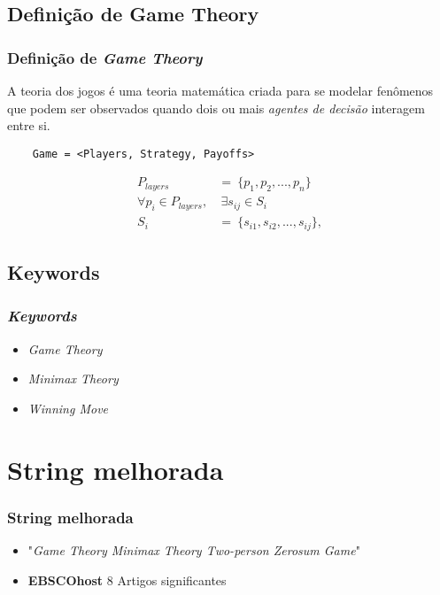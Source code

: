 \subsection{Definição de Game Theory}
\begin{frame}[fragile]
\frametitle{Definição de \textit{Game Theory}}
    A teoria dos jogos é uma teoria matemática criada para se modelar fenômenos que podem ser observados quando dois ou mais \textit{agentes de decisão} interagem entre si.
\begin{lstlisting}
    Game = <Players, Strategy, Payoffs>
\end{lstlisting}
\begin{equation*}
\begin{split}
  P_{layers}\ &=\ \{p_1, p_2,...,p_n\}\\
  \forall p_i \in P_{layers},&\ \exists s_{ij} \in S_i\\
  S_{i}\ &=\ \{s_{i1},s_{i2},...,s_{ij}\},
\end{split}
\end{equation*}
\end{frame}

\subsection{Keywords}
\begin{frame}
\frametitle{\textit{Keywords}}
\begin{itemize}
 \item \textit{Game Theory}
 \item \textit{Minimax Theory}
 \item \textit{Winning Move}
\end{itemize}
\end{frame}

\section{String melhorada}
\begin{frame}
\frametitle{String melhorada}
\begin{itemize}
 \item "\textit{Game Theory Minimax Theory Two-person Zerosum Game}"
\end{itemize}

\begin{itemize}
    \item \textbf{EBSCOhost} 8 Artigos significantes
\end{itemize}

\end{frame}
